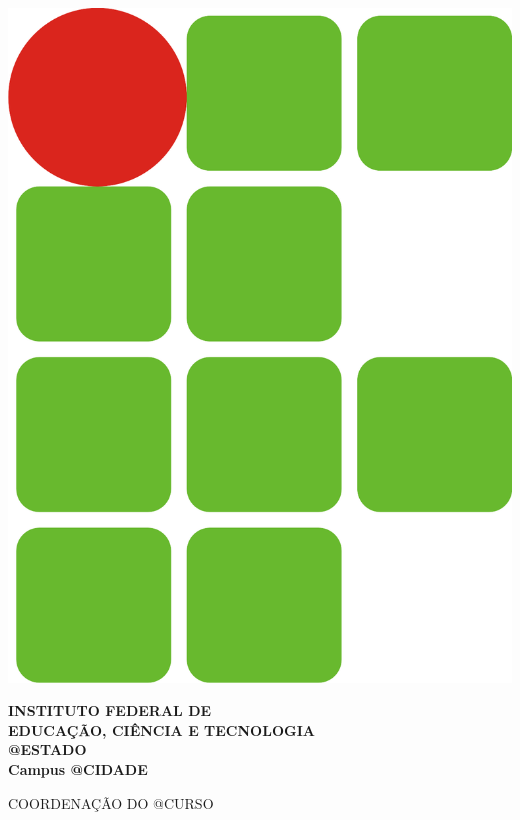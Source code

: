 \begin{minipage}{.19\textwidth}
    \includegraphics[width=.99\textwidth]{res/images/logo}
\end{minipage}
\begin{minipage}[t]{\textwidth}
    \vspace{.001cm}
    {\bf
        {\selectfont
            INSTITUTO FEDERAL DE\\
            EDUCAÇÃO, CIÊNCIA E TECNOLOGIA\\
            {\color{green}
                \uppercase{@ESTADO}\\
                Campus @CIDADE
            }
        }
    }
\end{minipage}

{\bf {\selectfont
    \begin{center} {\selectfont
		COORDENAÇÃO DO \uppercase{@CURSO}
    } \end{center}
} }